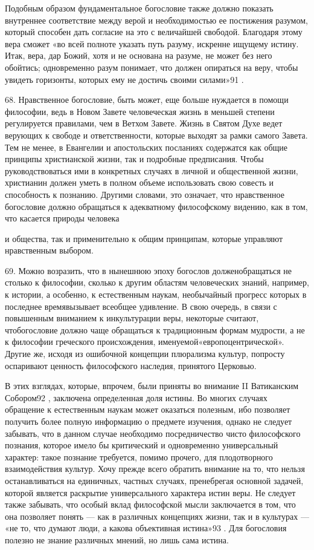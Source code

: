 \documentclass[a5paper,10pt]{article}
\begin{document}
Подобным образом фундаментальное богословие также должно показать внутреннее
соответствие между верой и необходимостью ее постижения разумом, который
способен дать согласие на это с величайшей свободой. Благодаря этому вера
сможет «во всей полноте указать путь разуму, искренне ищущему истину. Итак,
вера, дар Божий, хотя и не основана на разуме, не может без него обойтись;
одновременно разум понимает, что должен опираться на веру, чтобы увидеть
горизонты, которых ему не достичь своими силами»91 .

68. Нравственное богословие, быть может, еще больше нуждается в помощи
философии, ведь в Новом Завете человеческая жизнь в меньшей степени
регулируется правилами, чем в Ветхом Завете. Жизнь в Святом Духе ведет верующих
к свободе и ответственности, которые выходят за рамки самого Завета. Тем не
менее, в Евангелии и апостольских посланиях содержатся как общие принципы
христианской жизни, так и подробные предписания. Чтобы руководствоваться ими в
конкретных случаях в личной и общественной жизни, христианин должен уметь в
полном объеме использовать свою совесть и способность к познанию. Другими
словами, это означает, что нравственное богословие должно обращаться к
адекватному философскому видению, как в том, что касается природы человека

и общества, так и применительно к общим принципам, которые управляют
нравственным выбором.

69. Можно возразить, что в нынешнюю эпоху богослов долженобращаться не столько
к философии, сколько к другим областям человеческих знаний, например, к
истории, а особенно, к естественным наукам, необычайный прогресс которых в
последнее времявызывает всеобщее удивление. В свою очередь, в связи с
повышенным вниманием к инкультурации веры, некоторые считают, чтобогословие
должно чаще обращаться к традиционным формам мудрости, а не к философии
греческого происхождения, именуемой«европоцентрической». Другие же, исходя из
ошибочной концепции плюрализма культур, попросту оспаривают ценность
философского наследия, принятого Церковью.

В этих взглядах, которые, впрочем, были приняты во внимание II Ватиканским
Собором92 , заключена определенная доля истины. Во многих случаях обращение к
естественным наукам может оказаться полезным, ибо позволяет получить более
полную информацию о предмете изучения, однако не следует забывать, что в данном
случае необходимо посредничество чисто философского познания, которое имело бы
критический и одновременно универсальный характер: такое познание требуется,
помимо прочего, для плодотворного взаимодействия культур. Хочу прежде всего
обратить внимание на то, что нельзя останавливаться на единичных, частных
случаях, пренебрегая основной задачей, которой является раскрытие
универсального характера истин веры. Не следует также забывать, что особый
вклад философской мысли заключается в том, что она позволяет понять — как в
различных концепциях жизни, так и в культурах — «не то, что думают люди, а
какова объективная истина»93 . Для богословия полезно не знание различных
мнений, но лишь сама истина.
\end{document}
